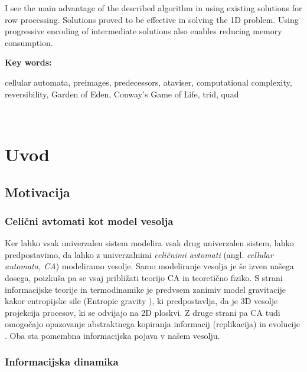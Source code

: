 \documentclass[12pt,a4paper,openany,twoside]{book}
\begin{document}
I see the main advantage of the described algorithm
in using existing solutions for row processing.
Solutions proved to be effective in solving the 1D problem.
Using progressive encoding of intermediate solutions
also enables reducing memory consumption.

\vspace{1.3cm}
\noindent
{\large \bf Key words:}

\vspace{0.5cm}
\noindent
cellular automata, preimages, predecessors, ataviser, computational complexity, reversibility, Garden of Eden, Conway's Game of Life, trid, quad
\newpage

\ \thispagestyle{empty}
\newpage


\chapter{Uvod}

\section{Motivacija}

\subsection{Celični avtomati kot model vesolja}

Ker lahko vsak univerzalen sistem modelira vsak drug univerzalen sistem, lahko predpostavimo,
da lahko z univerzalnimi \emph{celičnimi avtomati} (angl. \emph{cellular automata, CA}) modeliramo vesolje. Samo modeliranje vesolja
je še izven našega dosega, poizkuša pa se vsaj približati teorijo CA in teoretično fiziko.
S strani informacijske teorije in termodinamike je predvsem zanimiv model gravitacije
kakor entropijske sile (Entropic gravity \cite{Verlinde2010}), ki predpostavlja, da je
3D vesolje projekcija procesov, ki se odvijajo na 2D ploskvi. Z druge strani pa CA tudi omogočajo
opazovanje abstraktnega kopiranja informacij (replikacija) in evolucije \cite{Salzberg2004}.
Oba sta pomembna informacijska pojava v našem vesolju.

\subsection{Informacijska dinamika}
\end{document}
